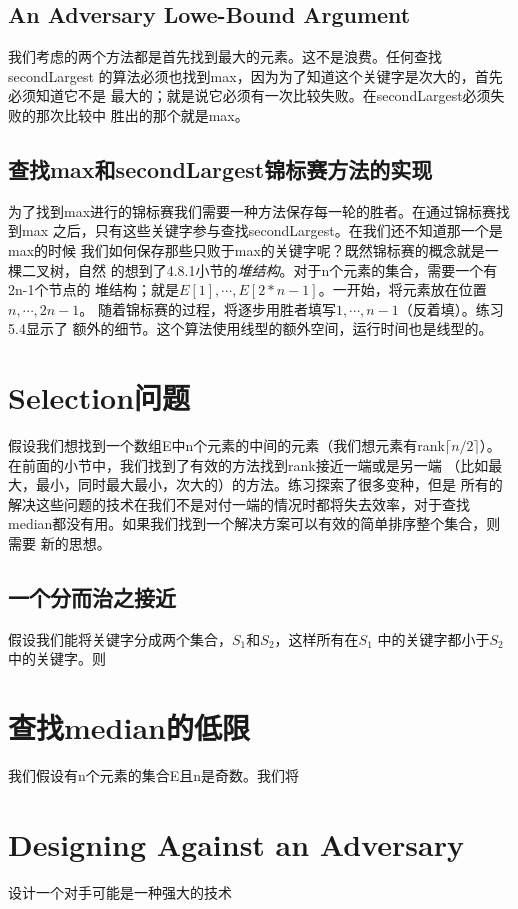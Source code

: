 \subsection{An Adversary Lowe-Bound Argument}
我们考虑的两个方法都是首先找到最大的元素。这不是浪费。任何查找secondLargest
的算法必须也找到max，因为为了知道这个关键字是次大的，首先必须知道它不是
最大的；就是说它必须有一次比较失败。在secondLargest必须失败的那次比较中
胜出的那个就是max。

\subsection{查找max和secondLargest锦标赛方法的实现}
为了找到max进行的锦标赛我们需要一种方法保存每一轮的胜者。在通过锦标赛找到max
之后，只有这些关键字参与查找secondLargest。在我们还不知道那一个是max的时候
我们如何保存那些只败于max的关键字呢？既然锦标赛的概念就是一棵二叉树，自然
的想到了4.8.1小节的\emph{堆结构}。对于n个元素的集合，需要一个有2n-1个节点的
堆结构；就是$E[1], \cdots,E[2*n-1]$。一开始，将元素放在位置$n, \cdots, 2n-1$。
随着锦标赛的过程，将逐步用胜者填写$1, \cdots,n-1$（反着填）。练习5.4显示了
额外的细节。这个算法使用线型的额外空间，运行时间也是线型的。

\section{Selection问题}
假设我们想找到一个数组E中n个元素的中间的元素（我们想元素有rank$\lceil
n/2
\rceil$）。在前面的小节中，我们找到了有效的方法找到rank接近一端或是另一端
（比如最大，最小，同时最大最小，次大的）的方法。练习探索了很多变种，但是
所有的解决这些问题的技术在我们不是对付一端的情况时都将失去效率，对于查找
median都没有用。如果我们找到一个解决方案可以有效的简单排序整个集合，则需要
新的思想。


\subsection{一个分而治之接近}
假设我们能将关键字分成两个集合，$S_1$和$S_2$，这样所有在$S_1$
中的关键字都小于$S_2$ 中的关键字。则

\section{查找median的低限}
我们假设有n个元素的集合E且n是奇数。我们将
\section{Designing Against an Adversary}
设计一个对手可能是一种强大的技术
